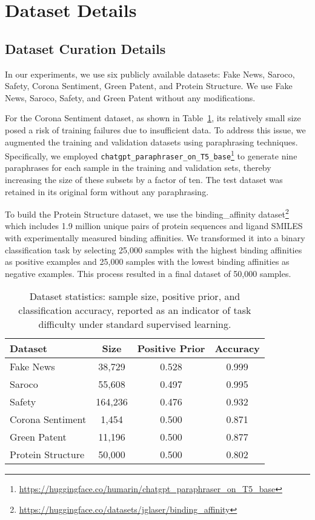 
\section{Dataset Details}
\label{sec:dataset}

\subsection{Dataset Curation Details}
In our experiments, we use six publicly available datasets: Fake News, Saroco, Safety, Corona Sentiment, Green Patent, and Protein Structure. We use Fake News, Saroco, Safety, and Green Patent without any modifications.

For the Corona Sentiment dataset, as shown in Table~\ref{tab:data_stat}, its relatively small size posed a risk of training failures due to insufficient data. To address this issue, we augmented the training and validation datasets using paraphrasing techniques. Specifically, we employed \texttt{chatgpt\_paraphraser\_on\_T5\_base}\footnote{\url{https://huggingface.co/humarin/chatgpt_paraphraser_on_T5_base}} to generate nine paraphrases for each sample in the training and validation sets, thereby increasing the size of these subsets by a factor of ten. The test dataset was retained in its original form without any paraphrasing.

To build the Protein Structure dataset, we use the binding\_affinity dataset\footnote{\url{https://huggingface.co/datasets/jglaser/binding_affinity}} which includes 1.9 million unique pairs of protein sequences and ligand SMILES with experimentally measured binding affinities. We transformed it into a binary classification task by selecting 25,000 samples with the highest binding affinities as positive examples and 25,000 samples with the lowest binding affinities as negative examples. This process resulted in a final dataset of 50,000 samples.


\begin{table}[t!]
\centering
\small %
\begin{tabular}{lccc}
\toprule
Dataset & Size & Positive Prior & Accuracy \\
\midrule
Fake News & 38,729 & 0.528 & 0.999\\
Saroco  & 55,608 & 0.497 & 0.995 \\
Safety & 164,236 & 0.476 & 0.932 \\
Corona Sentiment & 1,454 & 0.500 & 0.871 \\
Green Patent & 11,196 & 0.500 & 0.877 \\
Protein Structure & 50,000 & 0.500 & 0.802 \\
\bottomrule
\end{tabular}
\caption{Dataset statistics: sample size, positive prior, and classification accuracy, reported as an indicator of task difficulty under standard supervised learning.}
\label{tab:data_stat}
\vspace{-3pt}
\end{table}


